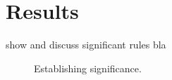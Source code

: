 %
%	
%
%

\section{Results}
\label{sec:significanceresults}
show and discuss significant rules \hfill bla

\begin{figure}[h]
	\centering
	
	\caption{Establishing significance.}
	\label{fig:null}
\end{figure}